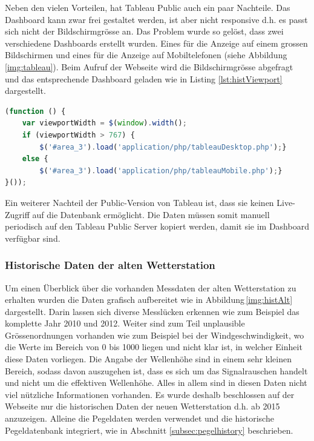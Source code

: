 \noindent
Neben den vielen Vorteilen, hat Tableau Public auch ein paar Nachteile. Das Dashboard kann zwar frei gestaltet werden, ist aber nicht responsive d.h. es passt sich nicht der Bildschirmgrösse an. Das Problem wurde so gelöst, dass zwei verschiedene Dashboards erstellt wurden. Eines für die Anzeige auf einem grossen Bildschirmen und eines für die Anzeige auf Mobiltelefonen (siehe Abbildung \ref{img:tableau}). Beim Aufruf der Webseite wird die Bildschirmgrösse abgefragt und das entsprechende Dashboard geladen wie in Listing \ref{lst:histViewport} dargestellt.

\vspace{3mm}
\begin{lstlisting}[label=lst:histViewport,caption=Auswahl des Dashboards anhand der Bildschirmgrösse, language=JavaScript, style=htmlcssjs]
(function () {
	var viewportWidth = $(window).width();
	if (viewportWidth > 767) {
		$('#area_3').load('application/php/tableauDesktop.php');}
	else {
		$('#area_3').load('application/php/tableauMobile.php');}
}());
\end{lstlisting}
\vspace{3mm}

\noindent
Ein weiterer Nachteil der Public-Version von Tableau ist, dass sie keinen Live-Zugriff auf die Datenbank ermöglicht. Die Daten müssen somit manuell periodisch auf den Tableau Public Server kopiert werden, damit sie im Dashboard verfügbar sind.


\subsubsection{Historische Daten der alten Wetterstation}
Um einen Überblick über die vorhanden Messdaten der alten Wetterstation zu erhalten wurden die Daten grafisch aufbereitet wie in Abbildung\,\ref{img:histAlt} dargestellt. Darin lassen sich diverse Messlücken erkennen wie zum Beispiel das komplette Jahr 2010 und 2012. Weiter sind zum Teil unplausible Grössenordnungen vorhanden wie zum Beispiel bei der Windgeschwindigkeit, wo die Werte im Bereich von 0 bis 1000 liegen und nicht klar ist, in welcher Einheit diese Daten vorliegen. Die Angabe der Wellenhöhe sind in einem sehr kleinen Bereich, sodass davon auszugehen ist, dass es sich um das Signalrauschen handelt und nicht um die effektiven Wellenhöhe. Alles in allem sind in diesen Daten nicht viel nützliche Informationen vorhanden. Es wurde deshalb beschlossen auf der Webseite nur die historischen Daten der neuen Wetterstation d.h. ab 2015 anzuzeigen. Alleine die Pegeldaten werden verwendet und die historische Pegeldatenbank integriert, wie in Abschnitt \ref{subsec:pegelhistory} beschrieben.

